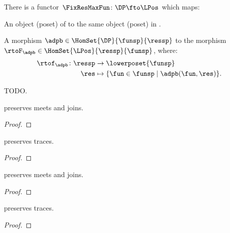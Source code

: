 \begin{lemma}
\label{lem:confunctor}
There is a functor~$\FixResMaxFun\colon \DP \fto \LPos$ which maps:
\begin{compactenum}
\item An object (poset) of \DP to the same object (poset) in \LPos.
\item A morphism $\adpb \in \HomSet{\DP}{\funsp}{\ressp}$ to the morphism~$\rtoF_\adpb\in \HomSet{\LPos}{\ressp}{\funsp}$, where:
\begin{equation*}
    \begin{aligned}
    \rtof_\adpb\colon \ressp &\to \lowerposet{\funsp}\\
    \res&\mapsto \{ \fun \in \funsp \mid \adpb(\fun,\res)\}.
    \end{aligned}
\end{equation*}
\end{compactenum}
\end{lemma}

\begin{marginfigure}
\begin{center}
\end{center}
    \caption{TODO.}
\end{marginfigure}



\begin{lemma}
    \FixFunMinRes preserves meets and joins.
\end{lemma}
\begin{proof}
\end{proof}

\begin{lemma}
    \FixFunMinRes preserves traces.
\end{lemma}
\begin{proof}
\end{proof}

\begin{lemma}
    \FixResMaxFun preserves meets and joins.
\end{lemma}
\begin{proof}
\end{proof}

\begin{lemma}
    \FixResMaxFun preserves traces.
\end{lemma}
\begin{proof}
\end{proof}